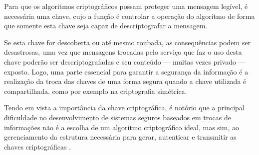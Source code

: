 \documentclass[12pt]{article}
\newcommand{\internet}{Internet\xspace}
\begin{document}
        Para que os algoritmos criptográficos possam proteger uma mensagem legível, é necessária uma chave, cujo a função é controlar a operação do algoritmo de forma que somente esta chave seja capaz de descriptografar a mensagem.
    

        Se esta chave for descoberta ou até mesmo roubada, as consequências podem ser desastrosas, uma vez que mensagens trocadas pelo serviço que faz o uso desta chave poderão ser descriptografadas e seu conteúdo --- muitas vezes privado --- exposto. Logo, uma parte essencial para garantir a segurança da informação é a realização da troca das chaves de uma forma segura quando a chave utilizada é compartilhada, como por exemplo na criptografia simétrica.
    
    
        Tendo em vista a importância da chave criptográfica, é notório que a principal dificuldade no desenvolvimento de sistemas seguros baseados em trocas de informações não é a escolha de um algoritmo criptográfico ideal, mas sim, ao gerenciamento da estrutura necessária para gerar, autenticar e transmitir as chaves criptográficas \cite{al2003certificateless}.
    
    
\end{document}
